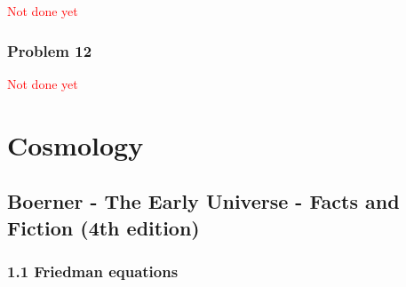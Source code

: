 \documentclass[10pt,a4paper]{article}
\theoremstyle{definition}
\begin{document}
\textcolor{red}{Not done yet}
\subsubsection{Problem 12}
\textcolor{red}{Not done yet}

\section{Cosmology}
\subsection{{\sc Boerner} - The Early Universe - Facts and Fiction (4th edition)}
\subsubsection{1.1 Friedman equations}
\end{document}
